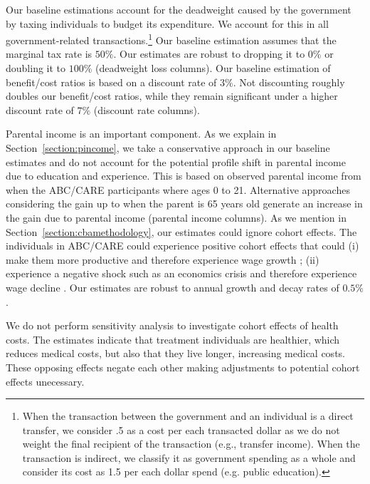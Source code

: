 Our baseline estimations account for the deadweight caused by the government by taxing individuals to budget its expenditure. We account for this in all government-related transactions.\footnote{When the transaction between the government and an individual is a direct transfer, we consider .5 as a cost per each transacted dollar as we do not weight the final recipient of the transaction (e.g., transfer income). When the transaction is indirect, we classify it as government spending as a whole and consider its cost as 1.5 per each dollar spend (e.g. public education).} Our baseline estimation assumes that the marginal tax rate is $50\%$. Our estimates are robust to dropping it to $0\%$ or doubling it to $100\%$ (deadweight loss columns). Our baseline estimation of benefit/cost ratios is based on a discount rate of $3\%$. Not discounting roughly doubles our benefit/cost ratios, while they remain significant under a higher discount rate of $7\%$ (discount rate columns).

Parental income is an important component. As we explain in Section~\ref{section:pincome}, we take a conservative approach in our baseline estimates and do not account for the potential profile shift in parental income due to education and experience. This is based on observed parental income from when the ABC/CARE participants where ages 0 to 21. Alternative approaches considering the gain up to when the parent is 65 years old generate an increase in the gain due to parental income (parental income columns). As we mention in Section~\ref{section:cbamethodology}, our estimates could ignore cohort effects. The individuals in ABC/CARE could experience positive cohort effects that could (i) make them more productive and therefore experience wage growth \citep{Lagakos_Moll_etal_2016_LifeCycle_NBER}; (ii) experience a negative shock such as an economics crisis and therefore experience wage decline \citep{jarosch2014searching}. Our estimates are robust to annual growth and decay rates of $0.5\%$. 

We do not perform sensitivity analysis to investigate cohort effects of health costs. The estimates indicate that treatment individuals are healthier, which reduces medical costs, but also that they live longer, increasing medical costs. These opposing effects negate each other making adjustments to potential cohort effects unecessary.

